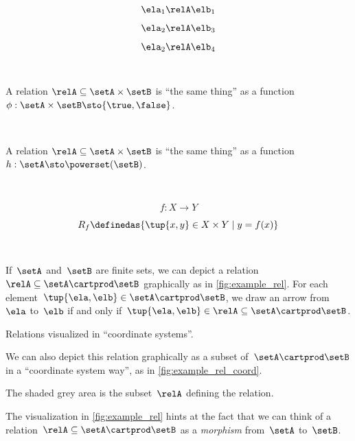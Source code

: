 {$$ \ela_1 \relA \elb_1 \label{eq:slides-16}$$

$$ \ela_2 \relA \elb_3 \label{eq:slides-17}$$

$$ \ela_2 \relA \elb_4 \label{eq:slides-18}$$

\

A relation $\relA \subseteq \setA \times \setB$ is ``the same thing'' as a function $\phi : \setA \times \setB \sto \{\true, \false\}$.

\


A relation $\relA \subseteq \setA \times \setB$ is ``the same thing'' as a function $h : \setA  \sto \powerset (\setB)$.

\

$$
f : X \to Y
$$


$$
R_f \definedas \{ \tup{x, y} \in X \times Y \mid y = f(x) \}
$$


}

\


\begin{marginfigure}
  \centering
  \caption{}
  \label{fig:example_rel}
\end{marginfigure}

If~$\setA$ and~$\setB$ are finite sets, we can depict a relation~$\relA \subseteq \setA \cartprod \setB$ graphically as in \cref{fig:example_rel}. For each element~$\tup{\ela,\elb} \in \setA \cartprod \setB$, we draw an arrow from~$\ela$ to~$\elb$ if and only if~$\tup{\ela,\elb} \in \relA \subseteq \setA \cartprod \setB$.


\begin{marginfigure}
  \begin{center}
  \end{center}
  \caption{Relations visualized in ``coordinate systems''.}
  \label{fig:example_rel_coord}
\end{marginfigure}

We can also depict this relation graphically as a subset of~$\setA \cartprod \setB$ in a ``coordinate system way'', as in \cref{fig:example_rel_coord}.

The shaded grey area is the subset~$\relA$ defining the relation.



The visualization in \cref{fig:example_rel} hints at the fact that we can think of a relation~$\relA \subseteq \setA \cartprod \setB$ as a \emph{morphism} from~$\setA$ to~$\setB$.

